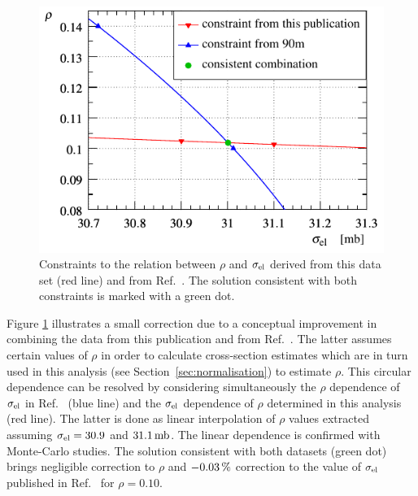 \begin{figure}
\vskip-5mm
\begin{center}
\includegraphics{fig/si_el_rho_solution.pdf}
\caption{%
Constraints to the relation between $\rho$ and $\sigma_{\rm el}$ derived from this data set (red line) and from Ref.~\cite{totem-13tev-90m}. The solution consistent with both constraints is marked with a green dot.
}
\label{fig:si_el rho sol}
\end{center}
\end{figure}


Figure \ref{fig:si_el rho sol} illustrates a small correction due to a conceptual improvement in combining the data from this publication and from Ref.~\cite{totem-13tev-90m}. The latter assumes certain values of $\rho$ in order to calculate cross-section estimates which are in turn used in this analysis (see Section~\ref{sec:normalisation}) to estimate $\rho$. This circular dependence can be resolved by considering simultaneously the $\rho$ dependence of $\sigma_{\rm el}$ in Ref.~\cite{totem-13tev-90m} (blue line) and the $\sigma_{\rm el}$ dependence of $\rho$ determined in this analysis (red line). The latter is done as linear interpolation of $\rho$ values extracted assuming $\sigma_{\rm el} = 30.9$ and $31.1\,{\rm mb}$. The linear dependence is confirmed with Monte-Carlo studies. The solution consistent with both datasets (green dot) brings negligible correction to $\rho$ and $-0.03\,{\rm \%}$ correction to the value of $\sigma_{\rm el}$ published in Ref.~\cite{totem-13tev-90m} for $\rho=0.10$.
